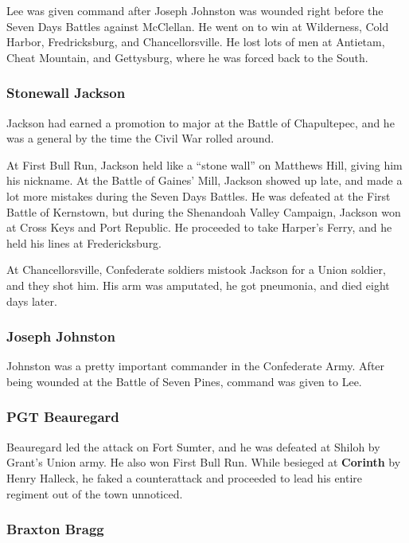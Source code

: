 Lee was given command after Joseph Johnston was wounded right before the Seven Days Battles against McClellan.
He went on to win at Wilderness, Cold Harbor, Fredricksburg, and Chancellorsville.
He lost lots of men at Antietam, Cheat Mountain, and Gettysburg, where he was forced back to the South.

\subsubsection*{Stonewall Jackson}

Jackson had earned a promotion to major at the Battle of Chapultepec,
and he was a general by the time the Civil War rolled around.

At First Bull Run, Jackson held like a ``stone wall'' on Matthews Hill, giving him his nickname.
At the Battle of Gaines' Mill, Jackson showed up late, and made a lot more mistakes during the Seven Days Battles.
He was defeated at the First Battle of Kernstown,
but during the Shenandoah Valley Campaign, Jackson won at Cross Keys and Port Republic.
He proceeded to take Harper's Ferry, and he held his lines at Fredericksburg.

At Chancellorsville, Confederate soldiers mistook Jackson for a Union soldier, and they shot him.
His arm was amputated, he got pneumonia, and died eight days later.

\subsubsection*{Joseph Johnston}

Johnston was a pretty important commander in the Confederate Army.
After being wounded at the Battle of Seven Pines, command was given to Lee.

\subsubsection*{PGT Beauregard}

Beauregard led the attack on Fort Sumter, and he was defeated at Shiloh by Grant's Union army.
He also won First Bull Run.
While besieged at \textbf{Corinth} by Henry Halleck,
he faked a counterattack and proceeded to lead his entire regiment out of the town unnoticed.

\subsubsection*{Braxton Bragg}

